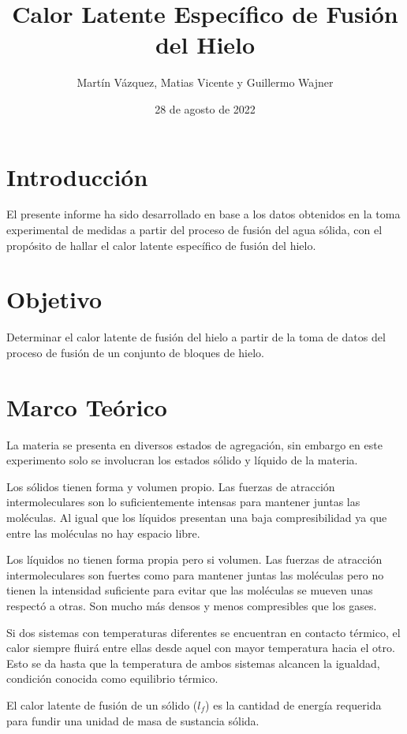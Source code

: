 \documentclass{article}
\title{Calor Latente Específico de Fusión del Hielo}
\author{Martín Vázquez, Matias Vicente y Guillermo Wajner}
\date{28 de agosto de 2022}
\begin{document}
\maketitle

\section{Introducción}

El presente informe ha sido desarrollado en base a los datos obtenidos en la toma experimental de medidas a partir del proceso de fusión del agua sólida, con el propósito de hallar el calor latente específico de fusión del hielo.  

\section{Objetivo}

Determinar el calor latente de fusión del hielo a partir de la toma de datos del proceso de fusión de un conjunto de bloques de hielo.

\section{Marco Teórico}

La materia se presenta en diversos estados de agregación, sin embargo en este experimento solo se involucran los estados sólido y líquido de la materia. 

Los sólidos tienen forma y volumen propio. Las fuerzas de atracción intermoleculares son lo suficientemente intensas para mantener juntas las moléculas. Al igual que los líquidos presentan una baja compresibilidad ya que entre las moléculas no hay espacio libre.

Los líquidos no tienen forma propia pero si volumen. Las fuerzas de atracción intermoleculares son fuertes como para mantener juntas las moléculas pero no tienen la intensidad suficiente para evitar que las moléculas se mueven unas respectó a otras. Son mucho más densos y menos compresibles que los gases.

Si dos sistemas con temperaturas diferentes se encuentran en contacto térmico, el calor siempre fluirá entre ellas desde aquel con mayor temperatura hacia el otro. Esto se da hasta que la temperatura de ambos sistemas alcancen la igualdad, condición conocida como equilibrio térmico.

El calor latente de fusión de un sólido ($l_f$) es la cantidad de energía requerida para fundir una unidad de masa de sustancia sólida.
\end{document}
